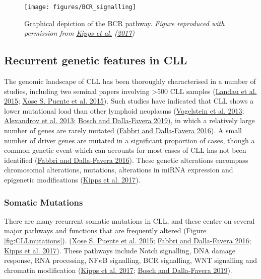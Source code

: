 \documentclass[11pt, a4paper, twosided]{book}
\begin{document}
\begin{figure}

{\centering \texttt{[image: figures/BCR\_signalling]} 

}

\caption{Graphical depiction of the BCR pathway. \emph{Figure reproduced with permission from \protect\hyperlink{ref-Kipps2017}{Kipps et al.} (\protect\hyperlink{ref-Kipps2017}{2017}) }}\label{fig:BCRsignalling}
\end{figure}
\hypertarget{intro-genetic-features}{%
\subsection{Recurrent genetic features in CLL}\label{intro-genetic-features}}

The genomic landscape of CLL has been thoroughly characterised in a number of studies, including two seminal papers involving \textgreater500 CLL samples (\protect\hyperlink{ref-Landau2015}{Landau et al. 2015}; \protect\hyperlink{ref-Puente2015}{Xose S. Puente et al. 2015}). Such studies have indicated that CLL shows a lower mutational load than other lymphoid neoplasms (\protect\hyperlink{ref-Vogelstein2013}{Vogelstein et al. 2013}; \protect\hyperlink{ref-Alexandrov2013}{Alexandrov et al. 2013}; \protect\hyperlink{ref-Bosch2019}{Bosch and Dalla-Favera 2019}), in which a relatively large number of genes are rarely mutated (\protect\hyperlink{ref-Fabbri2016}{Fabbri and Dalla-Favera 2016}). A small number of driver genes are mutated in a significant proportion of cases, though a common genetic event which can accounts for most cases of CLL has not been identified (\protect\hyperlink{ref-Fabbri2016}{Fabbri and Dalla-Favera 2016}). These genetic alterations encompass chromosomal alterations, mutations, alterations in miRNA expression and epigenetic modifications (\protect\hyperlink{ref-Kipps2017}{Kipps et al. 2017}).

\hypertarget{intro-mutations}{%
\subsubsection{Somatic Mutations}\label{intro-mutations}}

There are many recurrent somatic mutations in CLL, and these centre on several major pathways and functions that are frequently altered (Figure \ref{fig:CLLmutations}). (\protect\hyperlink{ref-Puente2015}{Xose S. Puente et al. 2015}; \protect\hyperlink{ref-Fabbri2016}{Fabbri and Dalla-Favera 2016}; \protect\hyperlink{ref-Kipps2017}{Kipps et al. 2017}). These pathways include Notch signalling, DNA damage response, RNA processing, NF\(\kappa\)B signalling, BCR signalling, WNT signalling and chromatin modification (\protect\hyperlink{ref-Kipps2017}{Kipps et al. 2017}; \protect\hyperlink{ref-Bosch2019}{Bosch and Dalla-Favera 2019}).
\end{document}
